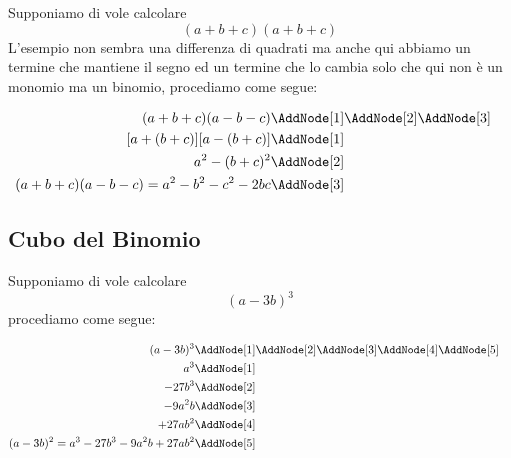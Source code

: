 \begin{esempiot}{}{}
Supponiamo di vole calcolare \[(a+b+c)(a+b+c)\]
L'esempio non sembra una differenza di quadrati ma anche qui abbiamo un termine che mantiene il segno ed un termine che lo cambia solo che qui non è un monomio ma un binomio, procediamo come segue:
\begin{NodesList}
	\begin{align*}
		(a+b+c)(a-b-c)&\AddNode[1]\AddNode[2]\AddNode[3]\\
		[a+(b+c)][a-(b+c)]&\AddNode[1]&\\ 
		a^2-(b+c)^2&\AddNode[2]&\\
		(a+b+c)(a-b-c)=a^2-b^2-c^2-2bc&\AddNode[3]
	\end{align*}
\end{NodesList}
\end{esempiot}
\subsection{Cubo del Binomio}
\begin{esempiot}{}{}
Supponiamo di vole calcolare \[(a-3b)^3\]
procediamo come segue:
\begin{NodesList}
	\begin{align*}
		(a-3b)^3&\AddNode[1]\AddNode[2]\AddNode[3]\AddNode[4]\AddNode[5]\\
		a^3&\AddNode[1]&\\ 
		-27b^3&\AddNode[2]&\\
		-9a^2b&\AddNode[3]\\
		+27ab^2&\AddNode[4]\\
		(a-3b)^2=a^3-27b^3-9a^2b+27ab^2&\AddNode[5]
	\end{align*}
\end{NodesList}
\end{esempiot}
